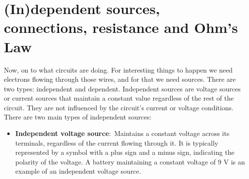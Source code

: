 \documentclass[nobib]{tufte-handout}
\newcommand{\defn}[2]{\noindent\textbf{#1}:\ #2}
\begin{document}
\pagebreak 

\section{(In)dependent sources, connections, resistance and Ohm's Law}
Now, on to what circuits are doing. For interesting things
to happen we need electrons flowing through those wires,
and for that we need sources. There are two types: independent and dependent.
Independent sources are voltage sources or current sources 
that maintain a constant value regardless of the rest of the 
circuit. They are not influenced by the circuit's current or 
voltage conditions. There are two main types of independent 
sources:
\begin{itemize}
    \item \defn{Independent voltage source}{Maintains a constant 
    voltage across its terminals, regardless of the current 
    flowing through it. It is typically represented by a 
    symbol with a plus sign and a minus sign, indicating 
    the polarity of the voltage.} A battery maintaining a constant
    voltage of 9 V is an example of an independent voltage source.
    \begin{marginfigure}
        \centering

\end{marginfigure}
\end{itemize}
\end{document}
